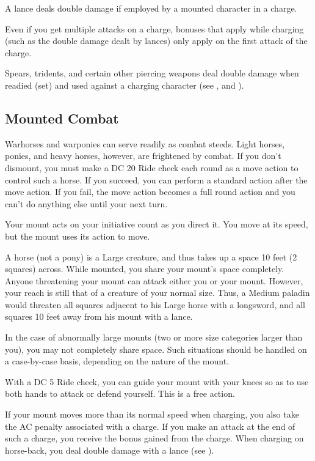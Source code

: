  A lance deals double damage if employed by a mounted character in a charge.

 Even if you get multiple attacks on a charge, bonuses that apply while charging (such as the double damage dealt by lances) only apply on the first attack of the charge.

 Spears, tridents, and certain other piercing weapons deal double damage when readied (set) and used against a charging character (see , and ).

\subsection{Mounted Combat}
 Warhorses and warponies can serve readily as combat steeds. Light horses, ponies, and heavy horses, however, are frightened by combat. If you don't dismount, you must make a DC 20 Ride check each round as a move action to control such a horse. If you succeed, you can perform a standard action after the move action. If you fail, the move action becomes a full round action and you can't do anything else until your next turn.

Your mount acts on your initiative count as you direct it. You move at its speed, but the mount uses its action to move.

 A horse (not a pony) is a Large creature, and thus takes up a space 10 feet (2 squares) across. While mounted, you share your mount's space completely. Anyone threatening your mount can attack either you or your mount. However, your reach is still that of a creature of your normal size. Thus, a Medium paladin would threaten all squares adjacent to his Large horse with a longsword, and all squares 10 feet away from his mount with a lance.

In the case of abnormally large mounts (two or more size categories larger than you), you may not completely share space. Such situations should be handled on a case-by-case basis, depending on the nature of the mount.

 With a DC 5 Ride check, you can guide your mount with your knees so as to use both hands to attack or defend yourself. This is a free action.

If your mount moves more than its normal speed when charging, you also take the AC penalty associated with a charge. If you make an attack at the end of such a charge, you receive the bonus gained from the charge. When charging on horse-back, you deal double damage with a lance (see ).

